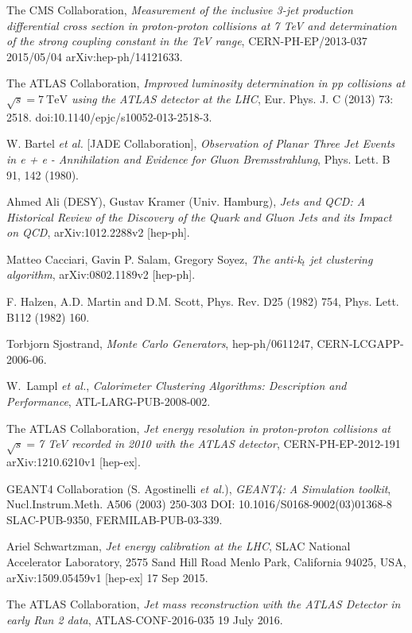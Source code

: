 \documentclass[UKenglish,texlive=2013]{\ATLASLATEXPATH atlasdoc}
\begin{document}
\begin{thebibliography}{9}
The CMS Collaboration,
\emph{Measurement of the inclusive 3-jet production differential
cross section in proton-proton collisions at 7 TeV and
determination of the strong coupling constant in the TeV
range},
CERN-PH-EP/2013-037
2015/05/04
arXiv:hep-ph/14121633.

The ATLAS Collaboration,
\emph{Improved luminosity determination in pp collisions at $\sqrt {s} = 7\ \mathrm{TeV}$ using the ATLAS detector at the LHC},
Eur. Phys. J. C (2013) 73: 2518. doi:10.1140/epjc/s10052-013-2518-3.

W. Bartel {\it et al.} [JADE Collaboration],
\emph{Observation of Planar Three Jet Events in e + e -
Annihilation and Evidence for Gluon Bremsstrahlung},
Phys. Lett. B 91, 142 (1980).

Ahmed Ali (DESY), Gustav Kramer (Univ. Hamburg),
\emph{Jets and QCD: A Historical Review of the Discovery of the Quark and Gluon Jets and its Impact on QCD},
arXiv:1012.2288v2 [hep-ph].

Matteo Cacciari, Gavin P. Salam, Gregory Soyez,
\emph{The anti-k$_t$ jet clustering algorithm},
arXiv:0802.1189v2 [hep-ph]. 

F. Halzen, A.D. Martin and D.M. Scott,  
Phys. Rev. D25 (1982) 754,
Phys. Lett. B112 (1982) 160.

Torbjorn Sjostrand,
\emph{Monte Carlo Generators},
hep-ph/0611247,
CERN-LCGAPP-2006-06.

W.~Lampl {\it et al.},
\emph{Calorimeter Clustering Algorithms: Description and Performance},
ATL-LARG-PUB-2008-002.

The ATLAS Collaboration,
\emph{Jet energy resolution in proton-proton collisions at $\sqrt{s}=$7 TeV recorded in 2010 with the ATLAS detector},
CERN-PH-EP-2012-191
arXiv:1210.6210v1  [hep-ex].

GEANT4 Collaboration (S. Agostinelli {\it et al.}), 
\emph{GEANT4: A Simulation toolkit},
Nucl.Instrum.Meth. A506 (2003) 250-303
DOI: 10.1016/S0168-9002(03)01368-8
SLAC-PUB-9350, FERMILAB-PUB-03-339.

Ariel Schwartzman,
\emph{Jet energy calibration at the LHC},
SLAC National Accelerator Laboratory, 2575 Sand Hill Road
Menlo Park, California 94025, USA,
arXiv:1509.05459v1 [hep-ex] 17 Sep 2015.

The ATLAS Collaboration,
\emph{Jet mass reconstruction with the ATLAS Detector in early Run 2 data},
ATLAS-CONF-2016-035
19 July 2016.


\end{thebibliography}
\end{document}
